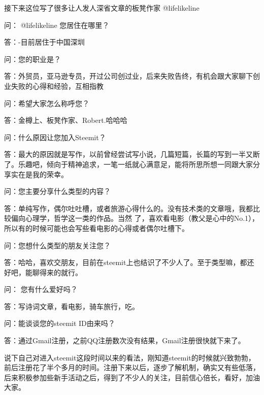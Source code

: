 \documentclass[]{ctexbook}
\begin{document}
接下来这位写了很多让人发人深省文章的板凳作家 @lifelikeline

问： @lifelikeline 您居住在哪里？

答：-目前居住于中国深圳

问：您的职业是？

答：外贸员，亚马逊专员，开过公司创过业，后来失败告终，有机会跟大家聊下创业失败的心得和经验，互相指教

问：希望大家怎么称呼您？

答：金樽上、板凳作家、Robert.哈哈哈

问：什么原因让您加入Steemit？

答：最大的原因就是写作，以前曾经尝试写小说，几篇短篇，长篇的写到一半又断了。乐趣吧，倾向于精神追求，一笔一纸就心满意足，能将所思所想一同跟大家分享实在是我的荣幸。

问：您主要分享什么类型的内容？

答：单纯写作，偶尔吐吐槽，或者旅游心得什么的。没有技术类的文章哦，我都比较偏向心理学，哲学这一类的作品。当然 了，喜欢看电影（教父是心中的No.1），所以有的时候可能也会写些看电影的心得或者偶尔吐槽下。

问：您想什么类型的朋友关注您？

答：哈哈，喜欢交朋友，目前在steemit上也结识了不少人了。至于类型嘛，都还好吧，能聊得来的就行。

问： 您有什么爱好吗？

答：写诗词文章，看电影，骑车旅行，吃。

问：能谈谈您的steemit ID由来吗？

答：通过Gmail注册，之前QQ注册数次没有结果，Gmail注册很快就下来了。

说下自己对进入steemit这段时间以来的看法，刚知道steemit的时候就兴致勃勃，前后注册花了半个多月的时间。注册下来以后，逐步了解机制，确实又有些低落，后来积极参加些新手活动之后，得到了不少人的关注，目前信心倍长，看好，加油大家。
\end{document}
